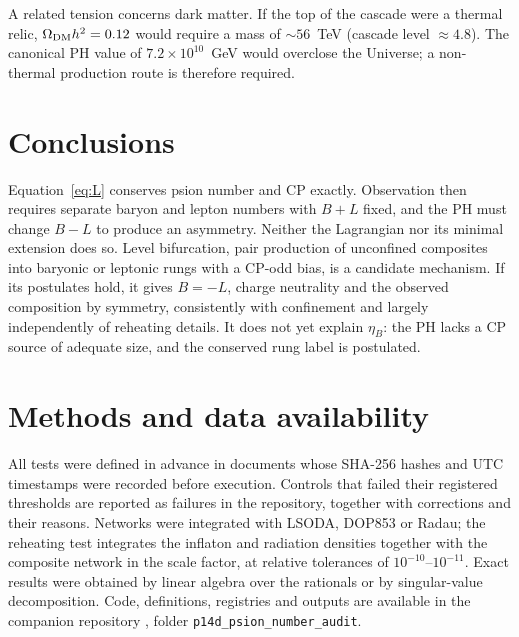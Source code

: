 \documentclass[11pt]{article}
\begin{document}
A related tension concerns dark matter. If the top of the cascade were a thermal relic, $\Omega_{\rm DM}h^2=0.12$ would require a mass of $\sim56$~TeV (cascade level $\approx4.8$). The canonical PH value of $7.2\times10^{10}$~GeV would overclose the Universe; a non-thermal production route is therefore required.

\section{Conclusions}

Equation~\eqref{eq:L} conserves psion number and CP exactly. Observation then requires separate baryon and lepton numbers with $B+L$ fixed, and the PH must change $B-L$ to produce an asymmetry. Neither the Lagrangian nor its minimal extension does so. Level bifurcation, pair production of unconfined composites into baryonic or leptonic rungs with a CP-odd bias, is a candidate mechanism. If its postulates hold, it gives $B=-L$, charge neutrality and the observed composition by symmetry, consistently with confinement and largely independently of reheating details. It does not yet explain $\eta_B$: the PH lacks a CP source of adequate size, and the conserved rung label is postulated.

\section*{Methods and data availability}
All tests were defined in advance in documents whose SHA-256 hashes and UTC timestamps were recorded before execution. Controls that failed their registered thresholds are reported as failures in the repository, together with corrections and their reasons. Networks were integrated with LSODA, DOP853 or Radau; the reheating test integrates the inflaton and radiation densities together with the composite network in the scale factor, at relative tolerances of $10^{-10}$--$10^{-11}$. Exact results were obtained by linear algebra over the rationals or by singular-value decomposition. Code, definitions, registries and outputs are available in the companion repository \cite{repo}, folder \texttt{p14d\_psion\_number\_audit}.
\end{document}
